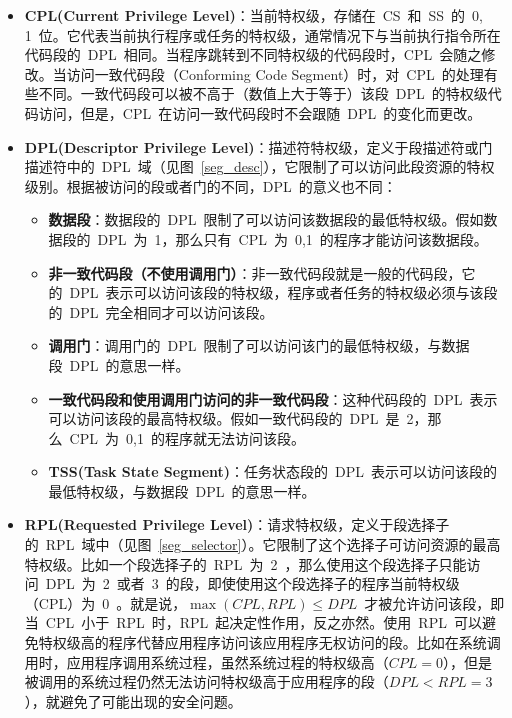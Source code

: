 \begin{itemize}
\item{\textbf{CPL(Current Privilege Level)}}：当前特权级，存储在~CS~和~SS~的~0, 1~位。它代表当前执行程序或任务的特权级，通常情况下与当前执行指令所在代码段的~DPL~相同。当程序跳转到不同特权级的代码段时，CPL~会随之修改。当访问一致代码段（Conforming Code Segment）时，对~CPL~的处理有些不同。一致代码段可以被不高于（数值上大于等于）该段~DPL~的特权级代码访问，但是，CPL~在访问一致代码段时不会跟随~DPL~的变化而更改。

\item{\textbf{DPL(Descriptor Privilege Level)}}：描述符特权级，定义于段描述符或门描述符中的~DPL~域（见图~\ref{seg_desc}），它限制了可以访问此段资源的特权级别。根据被访问的段或者门的不同，DPL~的意义也不同：
  \begin{itemize}
  \item{\textbf{数据段}}：数据段的~DPL~限制了可以访问该数据段的最低特权级。假如数据段的~DPL~为~1，那么只有~CPL~为~0,1~的程序才能访问该数据段。
  \item{\textbf{非一致代码段（不使用调用门）}}：非一致代码段就是一般的代码段，它的~DPL~表示可以访问该段的特权级，程序或者任务的特权级必须与该段的~DPL~完全相同才可以访问该段。
  \item{\textbf{调用门}}：调用门的~DPL~限制了可以访问该门的最低特权级，与数据段~DPL~的意思一样。
  \item{\textbf{一致代码段和使用调用门访问的非一致代码段}}：这种代码段的~DPL~表示可以访问该段的最高特权级。假如一致代码段的~DPL~是~2，那么~CPL~为~0,1~的程序就无法访问该段。
  \item{\textbf{TSS(Task State Segment)}}：任务状态段的~DPL~表示可以访问该段的最低特权级，与数据段~DPL~的意思一样。
  \end{itemize}

\item{\textbf{RPL(Requested Privilege Level)}}：请求特权级，定义于段选择子的~RPL~域中（见图~\ref{seg_selector}）。它限制了这个选择子可访问资源的最高特权级。比如一个段选择子的~RPL~为~2~，那么使用这个段选择子只能访问~DPL~为~2~或者~3~的段，即使使用这个段选择子的程序当前特权级（CPL）为~0~。就是说，$\max{(CPL, RPL)}\le DPL$~才被允许访问该段，即当~CPL~小于~RPL~时，RPL~起决定性作用，反之亦然。使用~RPL~可以避免特权级高的程序代替应用程序访问该应用程序无权访问的段。比如在系统调用时，应用程序调用系统过程，虽然系统过程的特权级高（$CPL=0$），但是被调用的系统过程仍然无法访问特权级高于应用程序的段（$DPL<RPL=3$），就避免了可能出现的安全问题。
\end{itemize}

